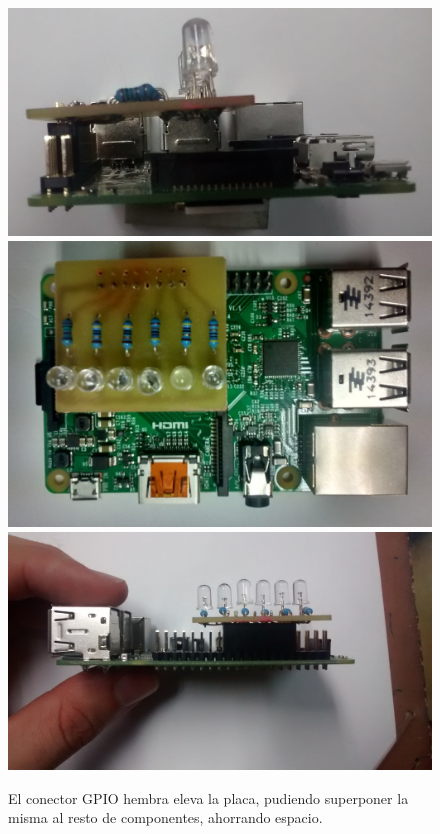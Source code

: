 \begin{figure}[H]
\centering
\includegraphics[height=0.116\textheight]{Chapters/Chapter5/Figures/estructuraFinal/pcb3}
\includegraphics[height=0.116\textheight]{Chapters/Chapter5/Figures/estructuraFinal/pcb4}
\includegraphics[height=0.116\textheight]{Chapters/Chapter5/Figures/estructuraFinal/pcb5}
\caption{El conector GPIO hembra eleva la placa, pudiendo superponer la misma al resto de componentes, ahorrando espacio.}
\end{figure}

